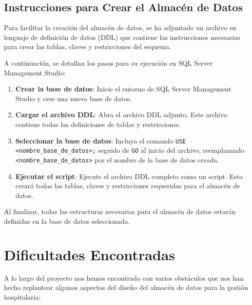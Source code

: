 \documentclass{article}
\begin{document}
\subsection{Instrucciones para Crear el Almacén de Datos}

Para facilitar la creación del almacén de datos, se ha adjuntado un archivo en lenguaje de definición de datos (DDL) que contiene las instrucciones necesarias para crear las tablas, claves y restricciones del esquema.

A continuación, se detallan los pasos para su ejecución en SQL Server Management Studio:

\begin{enumerate}
	\item \textbf{Crear la base de datos}: Inicie el entorno de SQL Server Management Studio y cree una nueva base de datos.
	\item \textbf{Cargar el archivo DDL}: Abra el archivo DDL adjunto. Este archivo contiene todas las definiciones de tablas y restricciones.
	\item \textbf{Seleccionar la base de datos}: Incluya el comando \texttt{USE <nombre\_base\_de\_datos>;} seguido de \texttt{GO} al inicio del archivo, reemplazando \texttt{<nombre\_base\_de\_datos>} por el nombre de la base de datos creada.
	\item \textbf{Ejecutar el script}: Ejecute el archivo DDL completo como un script. Esto creará todas las tablas, claves y restricciones requeridas para el almacén de datos.
\end{enumerate}

Al finalizar, todas las estructuras necesarias para el almacén de datos estarán definidas en la base de datos seleccionada.


\section{Dificultades Encontradas}
\label{sec:dificultades_encontradas}

A lo largo del proyecto nos hemos encontrado con varios obstáculos que nos han hecho replantear algunos aspectos del diseño del almacén de datos para la gestión hospitalaria:
\end{document}
